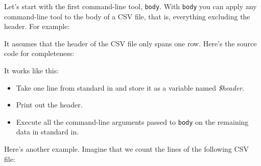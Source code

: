\documentclass[
]{book}
\newenvironment{Shaded}{\begin{snugshade}}{\end{snugshade}}
\newcommand{\BuiltInTok}[1]{#1}
\newcommand{\CommentTok}[1]{\textcolor[rgb]{0.56,0.35,0.01}{\textit{#1}}}
\newcommand{\ExtensionTok}[1]{#1}
\newcommand{\FunctionTok}[1]{\textcolor[rgb]{0.00,0.00,0.00}{#1}}
\newcommand{\KeywordTok}[1]{\textcolor[rgb]{0.13,0.29,0.53}{\textbf{#1}}}
\newcommand{\NormalTok}[1]{#1}
\newcommand{\StringTok}[1]{\textcolor[rgb]{0.31,0.60,0.02}{#1}}
\newcommand{\VariableTok}[1]{\textcolor[rgb]{0.00,0.00,0.00}{#1}}
\providecommand{\tightlist}{%
  \setlength{\itemsep}{0pt}\setlength{\parskip}{0pt}}
\theoremstyle{definition}
\theoremstyle{definition}
\theoremstyle{definition}
\theoremstyle{remark}
\begin{document}
Let's start with the first command-line tool, \texttt{body}. With \texttt{body} you can apply any command-line tool to the body of a CSV file, that is, everything excluding the header. For example:

\begin{Shaded}
\end{Shaded}

It assumes that the header of the CSV file only spans one row. Here's the source code for completeness:

\begin{Shaded}
\end{Shaded}

It works like this:

\begin{itemize}
\tightlist
\item
  Take one line from standard in and store it as a variable named \emph{\$header}.
\item
  Print out the header.
\item
  Execute all the command-line arguments passed to \texttt{body} on the remaining data in standard in.
\end{itemize}

Here's another example. Imagine that we count the lines of the following CSV file:

\begin{Shaded}
\end{Shaded}
\end{document}
